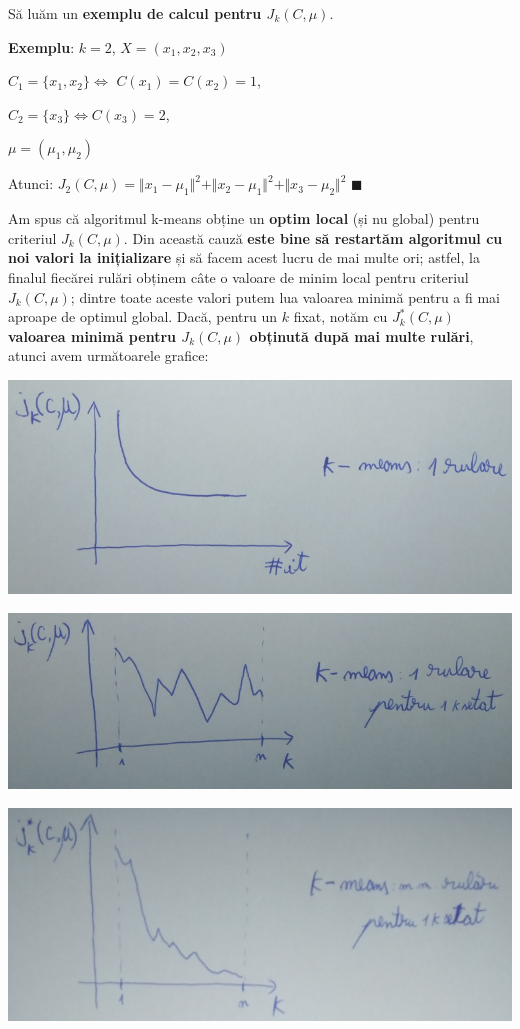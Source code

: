 \documentclass[12pt]{article}
\begin{document}
	Să luăm un \textbf{exemplu de calcul pentru $J_k(C,\mu)$}. 
	
	\textbf{Exemplu}: $k = 2$, $X = (x_1,x_2,x_3)$
	
	$C_1 = \{x_1,x_2\} \Leftrightarrow$ $C(x_1) = C(x_2) = 1$, 
	
	$C_2 = \{x_3\} \Leftrightarrow C(x_3) = 2$,
	
	$\mu = (\mu_1,\mu_2)$
	
	Atunci: $J_2(C,\mu) = \Vert x_1 - \mu_1\Vert^2 + \Vert x_2 - \mu_1\Vert^2 + \Vert x_3 - \mu_2\Vert^2$ $\blacksquare$
	
	Am spus că algoritmul k-means obține un \textbf{optim local} (și nu global) pentru criteriul $J_k(C,\mu)$. Din această cauză \textbf{este bine să restartăm algoritmul cu noi valori la inițializare} și să facem acest lucru de mai multe ori; astfel, la finalul fiecărei rulări obținem câte o valoare de minim local pentru criteriul $J_k(C,\mu)$; dintre toate aceste valori putem lua valoarea minimă pentru a fi mai aproape de optimul global. Dacă, pentru un $k$ fixat, notăm cu \textbf{$J^*_k(C,\mu)$ valoarea minimă pentru $J_k(C,\mu)$ obținută după mai multe rulări}, atunci avem următoarele grafice: 
	
	\begin{center}
		\includegraphics[width=1\linewidth]{screenshot004}
	\end{center}
	\begin{center}
		\includegraphics[width=1\linewidth]{screenshot005}
	\end{center}
	\begin{center}
		\includegraphics[width=1\linewidth]{screenshot006}
	\end{center}
	
\end{document}

